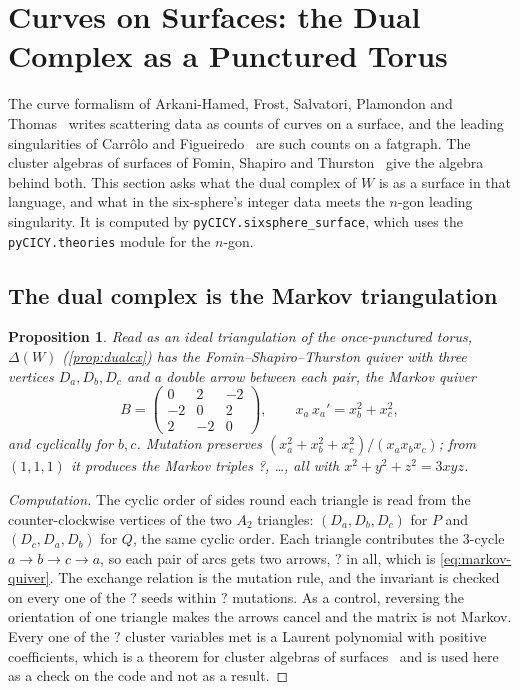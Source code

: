 \documentclass[11pt,a4paper]{article}
\newcommand{\SSSfArrows}{?}\newcommand{\SSSfSeeds}{?}\newcommand{\SSSfVariables}{?}
\newcommand{\SSSfDepth}{?}\newcommand{\SSSfTriples}{?}\newcommand{\SSSfLinkDepth}{?}
\theoremstyle{plain}
\newtheorem{proposition}{Proposition}
\theoremstyle{definition}
\begin{document}

\section{Curves on Surfaces: the Dual Complex as a Punctured Torus}
\label{sec:surface}

The curve formalism of Arkani-Hamed, Frost, Salvatori, Plamondon and Thomas~\cite{AHFPT} writes scattering data as counts of curves
on a surface, and the leading singularities of Carr\^olo and Figueiredo~\cite{CF} are such counts on a fatgraph. The cluster algebras of
surfaces of Fomin, Shapiro and Thurston~\cite{FST} give the algebra behind both. This section asks what the
dual complex of $W$ is as a surface in that language, and what in the six-sphere's integer data meets the $n$-gon leading singularity.
It is computed by \texttt{pyCICY.sixsphere\_surface}, which uses the \texttt{pyCICY.theories} module for the $n$-gon.

\subsection{The dual complex is the Markov triangulation}

\begin{proposition}
\label{prop:surf-markov}
Read as an ideal triangulation of the once-punctured torus, $\Delta(W)$ (\cref{prop:dualcx}) has the Fomin--Shapiro--Thurston quiver with
three vertices $D_a,D_b,D_c$ and a double arrow between each pair, the Markov quiver
\begin{equation}
  B=\begin{pmatrix}0&2&-2\\-2&0&2\\2&-2&0\end{pmatrix},\qquad x_a\,x_a'=x_b^2+x_c^2 ,
  \label{eq:markov-quiver}
\end{equation}
and cyclically for $b,c$. Mutation preserves $(x_a^2+x_b^2+x_c^2)/(x_ax_bx_c)$; from $(1,1,1)$ it produces the Markov triples
\SSSfTriples, \dots, all with $x^2+y^2+z^2=3xyz$.
\end{proposition}

\begin{proof}[Computation]
The cyclic order of sides round each triangle is read from the counter-clockwise vertices of the two $A_2$ triangles: $(D_a,D_b,D_c)$ for $P$ and
$(D_c,D_a,D_b)$ for $Q$, the same cyclic order. Each triangle contributes the $3$-cycle $a\to b\to c\to a$, so each pair of arcs gets two arrows,
$\SSSfArrows$ in all, which is \eqref{eq:markov-quiver}. The exchange relation is the mutation rule, and the invariant is checked on every one of the
$\SSSfSeeds$ seeds within $\SSSfDepth$ mutations. As a control, reversing the orientation of one triangle makes the arrows cancel and the matrix
is not Markov. Every one of the $\SSSfVariables$ cluster variables met is a Laurent polynomial with positive coefficients, which is a theorem
for cluster algebras of surfaces~\cite{FST,MSW} and is used here as a check on the code and not as a result.
\end{proof}
\end{document}
